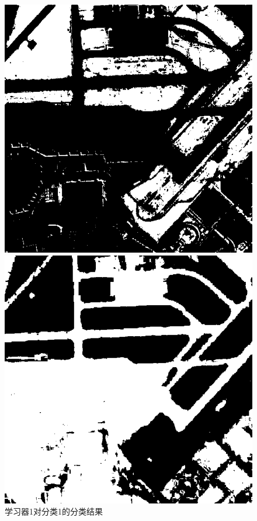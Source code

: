 \begin{figure}[H]
	\centering
	\begin{minipage}{0.45\linewidth}
		\includegraphics[width=\linewidth]{figure/airport_44_Classifier_1_Class_1.png}
		\caption{学习器1对分类1的分类结果}
	\end{minipage}
	\begin{minipage}{0.45\linewidth}
		\includegraphics[width=\linewidth]{figure/airport_44_Classifier_1_Class_2.png}

\end{minipage}
\end{figure}

